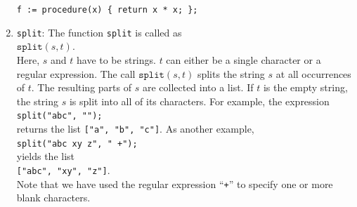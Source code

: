 \documentclass[11pt]{report}
\begin{document}
\begin{enumerate}
      \hspace*{1.3cm}
      \texttt{f := procedure(x) \{ return x * x; \};}
\item \texttt{split}: The function \texttt{split} is called as
      \\[0.2cm]
      \hspace*{1.3cm}
      $\texttt{split}(s,t)$.
      \\[0.2cm]
      Here, $s$ and $t$ have to be strings.  $t$ can either be a single character or 
      a regular expression. The call $\mathtt{split}(s, t)$ splits the string $s$ at all
      occurrences of $t$.  The resulting parts of $s$ are collected into a list.
      If $t$ is the empty string, the string $s$ is split into all of its characters.
      For example, the expression
      \\[0.2cm]
      \hspace*{1.3cm}
      \texttt{split("abc", "");}
      \\[0.2cm]
      returns the list \texttt{["a", "b", "c"]}.  As another example,
      \\[0.2cm]
      \hspace*{1.3cm}
      \texttt{split("abc  xy z", " +");}
      \\[0.2cm]
      yields the list
      \\[0.2cm]
      \hspace*{1.3cm}
      \texttt{["abc", "xy", "z"]}.
      \\[0.2cm]
      Note that we have used the regular expression ``\texttt{+}'' to specify one or more
      blank characters.


\end{enumerate}
\end{document}
